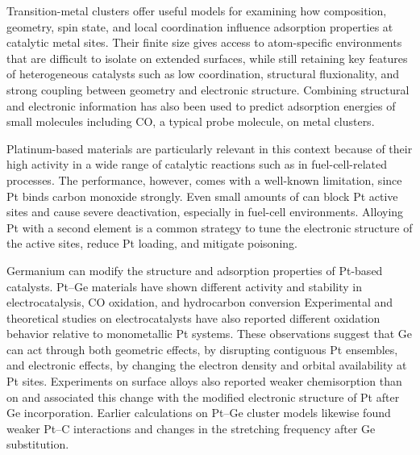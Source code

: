 
Transition-metal clusters offer useful models for examining how composition,
geometry, spin state, and local coordination influence adsorption properties at catalytic
metal sites\cite{cao:descriptors:2026,li:ptco:2025}. Their finite size gives access to atom-specific environments that
are difficult to isolate on extended surfaces, while still retaining key
features of heterogeneous catalysts such as low coordination, structural
fluxionality, and strong coupling between geometry and electronic structure.
Combining structural and electronic information has also been used
to predict adsorption energies of small molecules including CO, a typical probe
molecule, on metal clusters\cite{gasper:2017,pena:descriptors:2026}.

Platinum-based materials are particularly relevant in this context because of
their high activity in a wide range of
catalytic reactions such as in fuel-cell-related processes\cite{jimenezizal:2018,jimenezizal:2019b,yu:2002,
zhang:2014,auer:1998}. The performance, however, comes with a well-known
limitation, since Pt binds carbon monoxide strongly. Even small amounts of 
can block Pt active sites and cause severe deactivation, especially in
fuel-cell environments\cite{cheng:2007,vogel:1975,baschuk:2001,
christoffersen:2001,yang:2021}. Alloying Pt with a second element is 
a common strategy to tune the electronic structure of the active sites, reduce
Pt loading, and mitigate  poisoning\cite{yousaf:2016,yin:2011,
stolbov:2009,lee:1999,hayden:2003,samjeske:2002,ferrari:2016,ahmad:2015,
ehteshami:2013,chen:2019,ribeiro:2019}.

Germanium can modify the structure and adsorption properties of Pt-based
catalysts. Pt--Ge materials have shown different activity and stability in
electrocatalysis, CO oxidation, and hydrocarbon conversion\cite{lim:2018,
veizaga:2014,veizaga:2019,crabb:2001,gyorffy:2009,poths:2023,vilella:2008,
rimaz:2019,jimenezizal:2019,ma:2023,garetto:1996,mazzieri:2009,mariscal:2007}
Experimental and theoretical studies on  electrocatalysts have also
reported different  oxidation behavior relative to monometallic Pt
systems\cite{veizaga:2014,veizaga:2019,crabb:2001}. These observations suggest
that Ge can act through both geometric effects, by disrupting contiguous Pt
ensembles, and electronic effects, by changing the electron density and orbital
availability at Pt sites.
Experiments on  surface alloys also reported weaker 
chemisorption than on  and associated this change with the modified
electronic structure of Pt after Ge incorporation\cite{fukutani:1996,fukutani:1998}.
Earlier calculations on Pt--Ge cluster models likewise found weaker Pt--C
interactions and changes in the  stretching frequency after Ge
substitution\cite{liao:2000}.


